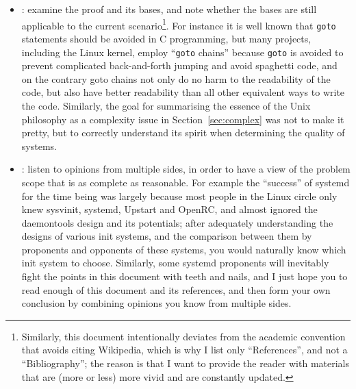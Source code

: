 \begin{itemize}
\item {}: examine the proof and its
	bases, and note whether the bases are still applicable to the current
	scenario\footnote{Similarly, this document intentionally deviates from the
	academic convention that avoids citing Wikipedia, which is why I list only
	``References'', and not a ``Bibliography''; the reason is that I want to
	provide the reader with materials that are (more or less) more vivid and
	are constantly updated.}.  For instance it is well known that \verb|goto|
	statements should be avoided in C programming, but many projects, including
	the Linux kernel, employ ``\verb|goto| chains''
	because \verb|goto| is avoided to prevent complicated back-and-forth jumping
	and avoid spaghetti code, and on the contrary goto chains not only do no
	harm to the readability of the code, but also have better readability than
	all other equivalent ways to write the code.  Similarly, the goal for
	summarising the essence of the Unix philosophy as a complexity issue in
	Section~\ref{sec:complex} was not to make it pretty, but to correctly
	understand its spirit when determining the quality of systems.
\item {}: listen to opinions
	from multiple sides, in order to have a view of the problem scope that is
	as complete as reasonable.  For example the ``success'' of systemd for the
	time being was largely because most people in the Linux circle only knew
	sysvinit, systemd, Upstart and OpenRC, and almost ignored the daemontools
	design and its potentials; after adequately understanding the designs of
	various init systems, and the comparison between them by proponents and
	opponents of these systems, you would naturally know which init system
	to choose.  Similarly, some systemd proponents will inevitably fight
	the points in this document with teeth and nails, and I just hope you
	to read enough of this document and its references, and then form your
	own conclusion by combining opinions you know from multiple sides.
\end{itemize}

